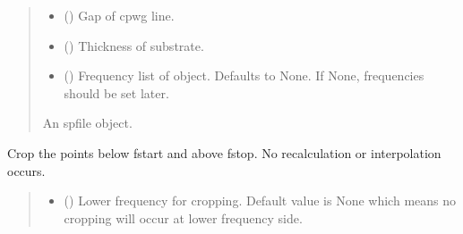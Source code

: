 \documentclass[letterpaper,10pt,english]{sphinxmanual}
\begin{document}
\begin{fulllineitems}
\begin{fulllineitems}
\begin{quote}
\begin{description}
\begin{itemize}
\item {} 
\sphinxAtStartPar
{} () \textendash{} Gap of cpwg line.

\item {} 
\sphinxAtStartPar
{} () \textendash{} Thickness of substrate.

\item {} 
\sphinxAtStartPar
{} (\sphinxstyleliteralemphasis{\sphinxupquote{, }}) \textendash{} Frequency list of object. Defaults to None. If None, frequencies should be set later.

\end{itemize}

\sphinxAtStartPar
An spfile object.

\sphinxAtStartPar
{\hyperref[\detokenize{touchstone:touchstone.spfile}]{}}

\end{description}\end{quote}

\end{fulllineitems}


\begin{fulllineitems}
\label{\detokenize{touchstone:touchstone.spfile.crop_with_frequency}}
\pysigstartsignatures
{}
\pysigstopsignatures
\sphinxAtStartPar
Crop the points below fstart and above fstop. No recalculation or interpolation occurs.
\begin{quote}\begin{description}
\begin{itemize}
\item {} 
\sphinxAtStartPar
{} (\sphinxstyleliteralemphasis{\sphinxupquote{, }}) \textendash{} Lower frequency for cropping. Default value is None which means no cropping will occur at lower frequency side.


\end{itemize}
\end{description}
\end{quote}
\end{fulllineitems}
\end{fulllineitems}
\end{document}
